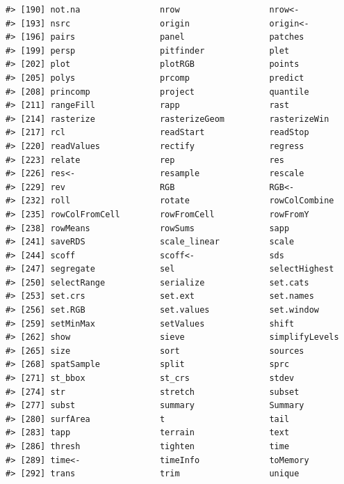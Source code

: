 \documentclass[
]{book}
\begin{document}
\begin{verbatim}
#> [190] not.na                nrow                  nrow<-               
#> [193] nsrc                  origin                origin<-             
#> [196] pairs                 panel                 patches              
#> [199] persp                 pitfinder             plet                 
#> [202] plot                  plotRGB               points               
#> [205] polys                 prcomp                predict              
#> [208] princomp              project               quantile             
#> [211] rangeFill             rapp                  rast                 
#> [214] rasterize             rasterizeGeom         rasterizeWin         
#> [217] rcl                   readStart             readStop             
#> [220] readValues            rectify               regress              
#> [223] relate                rep                   res                  
#> [226] res<-                 resample              rescale              
#> [229] rev                   RGB                   RGB<-                
#> [232] roll                  rotate                rowColCombine        
#> [235] rowColFromCell        rowFromCell           rowFromY             
#> [238] rowMeans              rowSums               sapp                 
#> [241] saveRDS               scale_linear          scale                
#> [244] scoff                 scoff<-               sds                  
#> [247] segregate             sel                   selectHighest        
#> [250] selectRange           serialize             set.cats             
#> [253] set.crs               set.ext               set.names            
#> [256] set.RGB               set.values            set.window           
#> [259] setMinMax             setValues             shift                
#> [262] show                  sieve                 simplifyLevels       
#> [265] size                  sort                  sources              
#> [268] spatSample            split                 sprc                 
#> [271] st_bbox               st_crs                stdev                
#> [274] str                   stretch               subset               
#> [277] subst                 summary               Summary              
#> [280] surfArea              t                     tail                 
#> [283] tapp                  terrain               text                 
#> [286] thresh                tighten               time                 
#> [289] time<-                timeInfo              toMemory             
#> [292] trans                 trim                  unique               

\end{verbatim}
\end{document}
